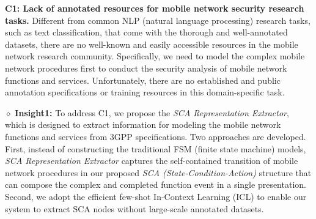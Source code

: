 \documentclass[sigconf]{acmart}
\begin{document}
\noindent \textbf{C1: Lack of annotated resources for mobile network security research tasks.}
Different from common NLP (natural language processing) research tasks, such as text classification, that come with the thorough and well-annotated datasets, there are no well-known and easily accessible resources in the mobile network research community. Specifically, we need to model the complex mobile network procedures first to conduct the security analysis of mobile network functions and services. Unfortunately, there are no established and public annotation specifications or training resources in this domain-specific task. 

\noindent $\diamond$ \textbf{Insight1:} To address C1, we propose the \textit{SCA Representation Extractor}, which is designed to extract information for modeling the mobile network functions and services from 3GPP specifications. Two approaches are developed. First, instead of constructing the traditional FSM (finite state machine) models, \textit{SCA Representation Extractor} captures the self-contained transition of mobile network procedures in our proposed \textit{SCA (State-Condition-Action)} structure that can compose the complex and completed function event in a single presentation. Second, we adopt the efficient few-shot In-Context Learning (ICL) to enable our system to extract SCA nodes without large-scale annotated datasets. 
\end{document}
